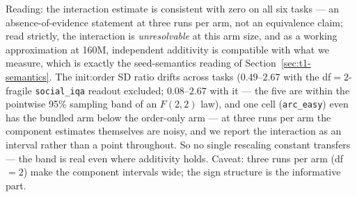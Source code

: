 Reading: the interaction estimate is consistent with zero on all six tasks --- an
absence-of-evidence statement at three runs per arm, not an equivalence claim; read
strictly, the interaction is \emph{unresolvable} at this arm size, and as a working
approximation at 160M, independent additivity is compatible with what we measure, which is
exactly the seed-semantics reading of
Section~\ref{sec:t1-semantics}. The init:order SD ratio drifts across tasks
($0.49$--$2.67$ with the df$=2$-fragile \texttt{social\_iqa} readout excluded; $0.08$--$2.67$
with it --- the five are within the pointwise 95\% sampling band of an $F(2,2)$ law), and one cell (\texttt{arc\_easy}) even has the bundled arm below the order-only arm
--- at three runs per arm the component estimates themselves are noisy, and we report the
interaction as an interval rather than a point throughout. So no
single rescaling constant transfers --- the band is real even where additivity holds. Caveat:
three runs per arm (df $=2$) make the component intervals wide; the sign structure is the
informative part.

